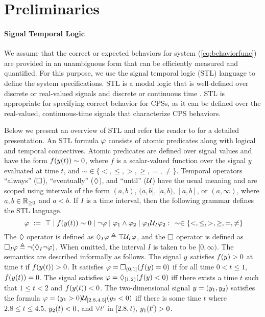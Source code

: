 \section{Preliminaries}
\paragraph{Signal Temporal Logic} 

We assume that the correct or expected behaviors for system (\ref{eq:behaviorfunc}) are provided in an unambiguous form that can be efficiently measured and quantified. For this purpose, we use the signal temporal logic (STL) language to define the system specifications.
STL is a modal logic that is well-defined over discrete or real-valued signals and discrete or continuous time \cite{MalerN04}.
STL is appropriate for specifying correct behavior for CPSs, as it can be defined over the real-valued, continuous-time signals that characterize CPS behaviors.
  
Below we present an overview of STL and refer the reader to \cite{MalerN04} for a detailed presentation.
An STL formula $\varphi$ consists of atomic predicates along with logical and temporal connectives.
Atomic predicates are defined over signal values and have the form $ f(y(t))\sim 0$, where $f$ is a scalar-valued function over the signal $y$ evaluated at time $t$, and $\sim \in \{ <,\leq, >, \geq, =, \neq \}$.
Temporal operators ``always'' ($\Box$), ``eventually'' ($\Diamond$), and ``until'' ($\mathcal{U}$) have the usual meaning and are scoped using intervals of the form $(a,b)$, $(a,b]$, $[a,b)$, $[a,b]$, or $(a,\infty)$, where 
$a,b\in \mathbb{R}_{\geq 0}$ and $a<b$. If $I$ is a time interval, then the following grammar defines the STL language.
\begin{equation}~\label{eqn:stl-gen}
\varphi ~ := ~ \top \; | \; f(y(t))\sim 0 \; | \; \neg \varphi \; | \;
\varphi_1 \wedge \varphi_2 \; | \; \varphi_1 \mathcal{U}_I \varphi_2:~~\sim \in \{ <,\leq,>,\geq,=,\neq \}
\end{equation}
The $\Diamond$ operator is defined as $\Diamond_I \varphi \triangleq \top \mathcal{U}_I \varphi$, and the $\Box$ operator is defined as $\Box_I \varphi \triangleq \neg (\Diamond _I \neg \varphi)$. When omitted, the interval $I$ is taken  to be $[0,\infty)$. The semantics are described informally as follows. The signal $y$ satisfies $f(y)> 0$ at time $t$ if $f(y(t))>0$. It satisfies $\varphi = \Box_{(0,1]}(f(y)=0)$ if for all time $0< t \leq 1$, $f(y(t))=0$. The signal satisfies $\varphi= \Diamond_{[1,2)}(f(y)<0)$ iff there exists a time $t$ such that $1\leq t < 2$ and $f(y(t))<0$. The two-dimensional signal $y=(y_1,y_2)$ satisfies the formula $\varphi=(y_1>0)\mathcal{U}_{[2.8,4.5]}(y_2<0)$ iff there is some time $t$ where $2.8 \leq t \leq 4.5$, $y_2(t)<0$, and $\forall t'$ in $[2.8,t)$, $y_1(t')>0$. 

